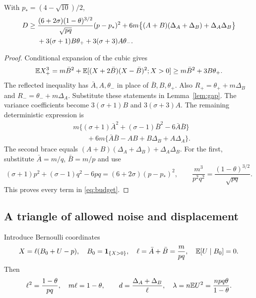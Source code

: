 \begin{theorem}\label{thm:budget}
With $p_*=(4-\sqrt{10})/2$,
\begin{align}
 D\ge{}&\frac{(6+2\sigma)(1-\theta)^{3/2}}{\sqrt{pq}}(p-p_*)^2
 +6m\bigl\{(A+B)(\Delta_A+\Delta_B)+\Delta_A\Delta_B\bigr\}\notag\\
 &+3(\sigma+1)B\theta_++3(\sigma+3)A\theta_-.
 \label{eq:budget}
\end{align}
\end{theorem}
\begin{proof}
Conditional expansion of the cubic gives
\[
 \mathbb E X_+^3=m\bar B^2+
 \mathbb E[(X+2\bar B)(X-\bar B)^2;X>0]
 \ge m\bar B^2+3B\theta_+.
\]
The reflected inequality has $\bar A,A,\theta_-$ in place of
$\bar B,B,\theta_+$. Also
$R_+=\theta_++m\Delta_B$ and
$R_-=\theta_-+m\Delta_A$.
Substitute these statements in Lemma~\ref{lem:gap}. The variance
coefficients become $3(\sigma+1)B$ and $3(\sigma+3)A$.
The remaining deterministic expression is
\begin{align*}
 &m\{(\sigma+1)\bar A^2+(\sigma-1)\bar B^2-6\bar A\bar B\}\\
 &\qquad+6m\{\bar A\bar B-AB+B\Delta_B+A\Delta_A\}.
\end{align*}
The second brace equals
$(A+B)(\Delta_A+\Delta_B)+\Delta_A\Delta_B$.
For the first, substitute $\bar A=m/q$, $\bar B=m/p$ and use
\[
 (\sigma+1)p^2+(\sigma-1)q^2-6pq
       =(6+2\sigma)(p-p_*)^2,
 \qquad \frac{m^3}{p^2q^2}=\frac{(1-\theta)^{3/2}}{\sqrt{pq}}.
\]
This proves every term in \eqref{eq:budget}.
\end{proof}

\subsection{A triangle of allowed noise and displacement}
Introduce Bernoulli coordinates
\[
 X=\ell(B_0+U-p),\quad B_0=\mathbf1_{\{X>0\}},\quad
 \ell=\bar A+\bar B=\frac m{pq},\quad \mathbb E[U\mid B_0]=0.
\]
Then
\[
 \ell^2=\frac{1-\theta}{pq},\quad m\ell=1-\theta,
 \qquad d=\frac{\Delta_A+\Delta_B}{\ell},\quad
 \lambda=n\mathbb E U^2=\frac{npq\theta}{1-\theta}.
\]

